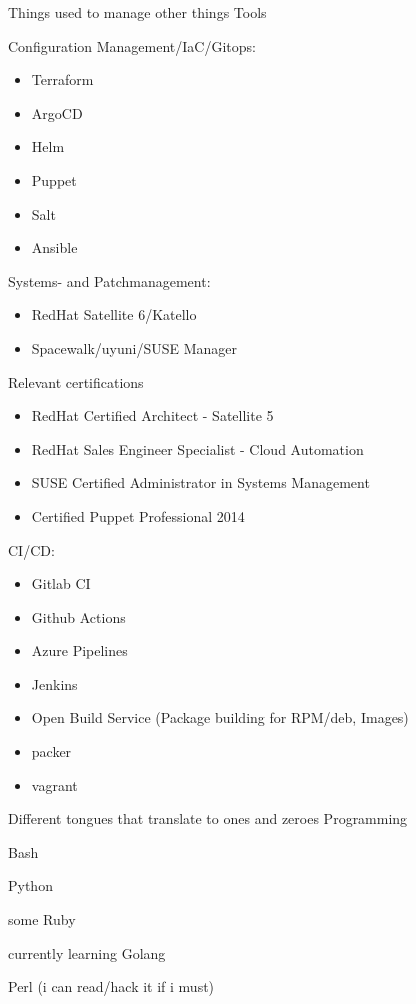 \begin{cventries}
{    }
  \cventry
    {Things used to manage other things}
    {Tools}
    {}
    {}
    {
      \begin{cvitems}
        \item Configuration Management/IaC/Gitops:
          \begin{itemize}
            \item Terraform
            \item ArgoCD
            \item Helm
            \item Puppet
            \item Salt
            \item Ansible
          \end{itemize}
        \item Systems- and Patchmanagement:
        \begin{itemize}
          \item RedHat Satellite 6/Katello
          \item Spacewalk/uyuni/SUSE Manager
        \end{itemize}
        \item Relevant certifications
          \begin{itemize}
            \item RedHat Certified Architect - Satellite 5
            \item RedHat Sales Engineer Specialist - Cloud Automation
            \item SUSE Certified Administrator in Systems Management
            \item Certified Puppet Professional 2014
          \end{itemize}
      \item CI/CD:
        \begin{itemize}
          \item Gitlab CI
          \item Github Actions
          \item Azure Pipelines
          \item Jenkins
          \item Open Build Service (Package building for RPM/deb, Images)
          \item packer
          \item vagrant
        \end{itemize}
      \end{cvitems}
    }

  \cventry
    {Different tongues that translate to ones and zeroes}
    {Programming}
    {}
    {}
    {
      \begin{cvitems}
        \item Bash
        \item Python
        \item some Ruby
        \item currently learning Golang
        \item Perl (i can read/hack it if i must)
      \end{cvitems}
    }

\end{cventries}

